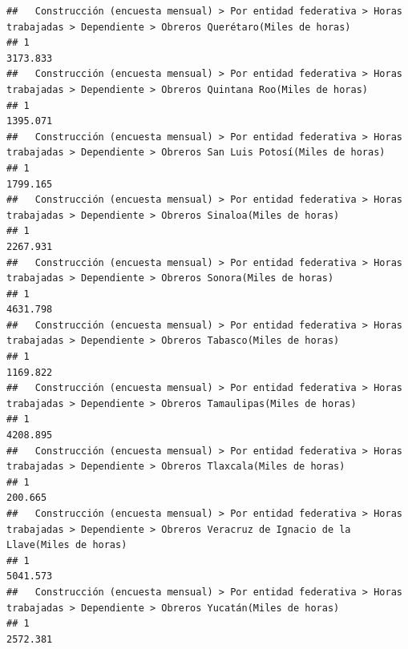 \documentclass[
]{article}
\begin{document}
\begin{verbatim}
##   Construcción (encuesta mensual) > Por entidad federativa > Horas trabajadas > Dependiente > Obreros Querétaro(Miles de horas) 
## 1                                                                                                                       3173.833
##   Construcción (encuesta mensual) > Por entidad federativa > Horas trabajadas > Dependiente > Obreros Quintana Roo(Miles de horas) 
## 1                                                                                                                          1395.071
##   Construcción (encuesta mensual) > Por entidad federativa > Horas trabajadas > Dependiente > Obreros San Luis Potosí(Miles de horas) 
## 1                                                                                                                             1799.165
##   Construcción (encuesta mensual) > Por entidad federativa > Horas trabajadas > Dependiente > Obreros Sinaloa(Miles de horas) 
## 1                                                                                                                     2267.931
##   Construcción (encuesta mensual) > Por entidad federativa > Horas trabajadas > Dependiente > Obreros Sonora(Miles de horas) 
## 1                                                                                                                    4631.798
##   Construcción (encuesta mensual) > Por entidad federativa > Horas trabajadas > Dependiente > Obreros Tabasco(Miles de horas) 
## 1                                                                                                                     1169.822
##   Construcción (encuesta mensual) > Por entidad federativa > Horas trabajadas > Dependiente > Obreros Tamaulipas(Miles de horas) 
## 1                                                                                                                        4208.895
##   Construcción (encuesta mensual) > Por entidad federativa > Horas trabajadas > Dependiente > Obreros Tlaxcala(Miles de horas) 
## 1                                                                                                                       200.665
##   Construcción (encuesta mensual) > Por entidad federativa > Horas trabajadas > Dependiente > Obreros Veracruz de Ignacio de la Llave(Miles de horas) 
## 1                                                                                                                                             5041.573
##   Construcción (encuesta mensual) > Por entidad federativa > Horas trabajadas > Dependiente > Obreros Yucatán(Miles de horas) 
## 1                                                                                                                     2572.381

\end{verbatim}
\end{document}
